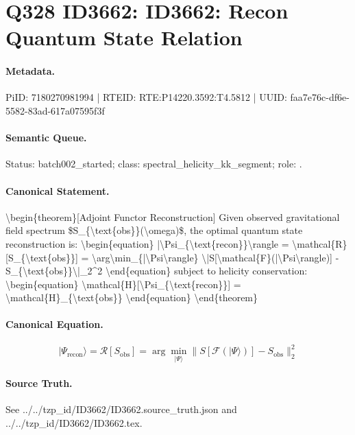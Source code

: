 \section*{Q328 ID3662: ID3662: Recon Quantum State Relation}
\paragraph{Metadata.}
PiID: 7180270981994 | RTEID: RTE:P14220.3592:T4.5812 | UUID: faa7e76c-df6e-5582-83ad-617a07595f3f

\paragraph{Semantic Queue.}
Status: batch002\_started; class: spectral\_helicity\_kk\_segment; role: .

\paragraph{Canonical Statement.}
\textbackslash{}begin\{theorem\}[Adjoint Functor Reconstruction] Given observed gravitational field spectrum \$S\_\{\textbackslash{}text\{obs\}\}(\textbackslash{}omega)\$, the optimal quantum state reconstruction is: \textbackslash{}begin\{equation\} |\textbackslash{}Psi\_\{\textbackslash{}text\{recon\}\}\textbackslash{}rangle = \textbackslash{}mathcal\{R\}[S\_\{\textbackslash{}text\{obs\}\}] = \textbackslash{}arg\textbackslash{}min\_\{|\textbackslash{}Psi\textbackslash{}rangle\} \textbackslash{}|S[\textbackslash{}mathcal\{F\}(|\textbackslash{}Psi\textbackslash{}rangle)] - S\_\{\textbackslash{}text\{obs\}\}\textbackslash{}|\_2\textasciicircum{}2 \textbackslash{}end\{equation\} subject to helicity conservation: \textbackslash{}begin\{equation\} \textbackslash{}mathcal\{H\}[\textbackslash{}Psi\_\{\textbackslash{}text\{recon\}\}] = \textbackslash{}mathcal\{H\}\_\{\textbackslash{}text\{obs\}\} \textbackslash{}end\{equation\} \textbackslash{}end\{theorem\}

\paragraph{Canonical Equation.}
\[
\begin{equation} |\Psi_{\text{recon}}\rangle = \mathcal{R}[S_{\text{obs}}] = \arg\min_{|\Psi\rangle} \|S[\mathcal{F}(|\Psi\rangle)] - S_{\text{obs}}\|_2^2 \end{equation}
\]

\paragraph{Source Truth.}
See ../../tzp\_id/ID3662/ID3662.source\_truth.json and ../../tzp\_id/ID3662/ID3662.tex.
